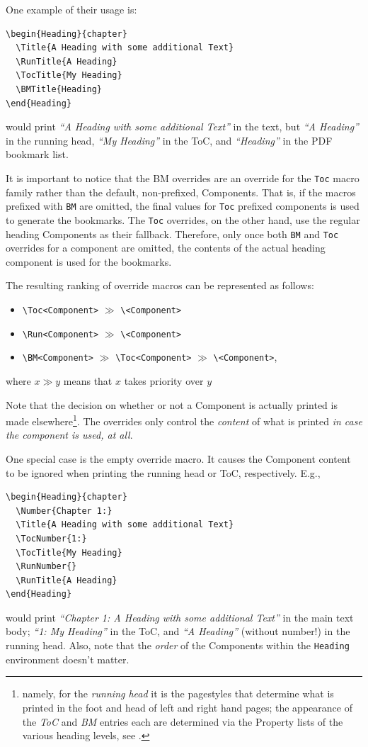 One example of their usage is:
\begin{lstlisting}[style=tex]
\begin{Heading}{chapter}
  \Title{A Heading with some additional Text}
  \RunTitle{A Heading}
  \TocTitle{My Heading}
  \BMTitle{Heading}
\end{Heading}
\end{lstlisting}
would print \textit{“A Heading with some additional Text”} in the
text, but \textit{“A Heading”} in the running head, \textit{“My
  Heading”} in the ToC, and \textit{“Heading”} in the PDF bookmark
list.

It is important to notice that the BM overrides are an override for
the \lstinline{Toc} macro family rather than the default,
non-prefixed, Components. That is, if the macros prefixed with
\lstinline{BM} are omitted, the final values for \lstinline{Toc}
prefixed components is used to generate the bookmarks. The
\lstinline{Toc} overrides, on the other hand, use the regular heading
Components as their fallback. Therefore, only once both \lstinline{BM}
and \lstinline{Toc} overrides for a component are omitted, the
contents of the actual heading component is used for the bookmarks.

The resulting ranking of override macros can be represented as
follows:
\begin{itemize}
\item \lstinline{\Toc<Component>} $\gg$ \lstinline{\<Component>}
\item \lstinline{\Run<Component>} $\gg$ \lstinline{\<Component>}
\item \lstinline{\BM<Component>} $\gg$ \lstinline{\Toc<Component>} $\gg$ \lstinline{\<Component>},
\end{itemize}
where $x\gg y$ means that $x$ takes priority over $y$

Note that the decision on whether or not a Component is actually
printed is made elsewhere\footnote{namely, for the
  \textit{running head} it is the pagestyles that determine what is
  printed in the foot and head of left and right hand pages; the
  appearance of the \textit{ToC} and \textit{BM} entries each are
  determined via the Property lists of the various heading levels, see
  .}. The overrides only control the
\textit{content} of what is printed \textit{in case the component is
  used, at all}.

One special case is the empty override
macro. It causes the Component content to be ignored when printing the
running head or ToC, respectively. E.g.,
\begin{lstlisting}[style=tex]
\begin{Heading}{chapter}
  \Number{Chapter 1:}
  \Title{A Heading with some additional Text}
  \TocNumber{1:}
  \TocTitle{My Heading}
  \RunNumber{}
  \RunTitle{A Heading}
\end{Heading}
\end{lstlisting}
would print \textit{“Chapter 1: A Heading with some additional Text”}
in the main text body; \textit{“1: My Heading”} in the ToC, and
\textit{“A Heading”} (without number!) in the running head. Also, note
that the \textit{order} of the Components within the \texttt{Heading}
environment doesn't matter.

